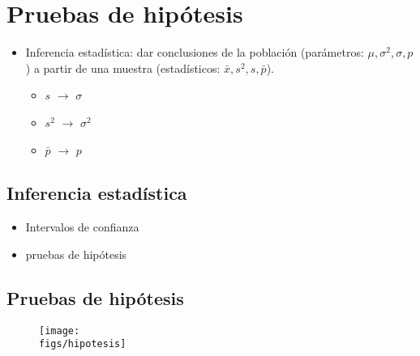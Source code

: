\section{Pruebas de hipótesis}
\begin{itemize}
    \item Inferencia estadística: dar conclusiones de la población (parámetros: $\mu, \sigma^2 , \sigma, p$) a partir de una muestra (estadísticos: $\bar{x}, s^2, s, \bar{p}$).
        \begin{itemize}
            \item $s$ $\longrightarrow$ $\sigma$
            \item $s^2$ $\longrightarrow$ $\sigma^2$   
            \item $\bar{p}$ $\longrightarrow$ $p$   
        \end{itemize}
\end{itemize}

\subsection{Inferencia estadística}
\begin{itemize}
    \item Intervalos de confianza 
    \item pruebas de hipótesis
\end{itemize}

\subsection{Pruebas de hipótesis}
\begin{figure}[H]
    \centering
    \texttt{[image: \\figs/hipotesis]} 
\end{figure}

